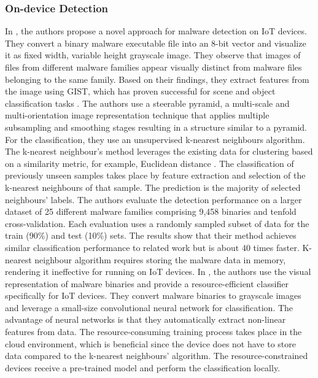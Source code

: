\documentclass[conference, 11pt]{IEEEtran}
\begin{document}
    \subsubsection{On-device Detection}
    In \cite{article:7}, the authors propose a novel approach for malware detection on IoT devices.
    They convert a binary malware executable file into an 8-bit vector and visualize it as fixed width, variable height grayscale image.
    They observe that images of files from different malware families appear visually distinct from malware files belonging to the same family.
    Based on their findings, they extract features from the image using GIST, which has proven successful for scene and object classification tasks \cite{torralba2003context}.
    The authors use a steerable pyramid, a multi-scale and multi-orientation image representation technique that applies multiple subsampling and smoothing stages resulting in a structure similar to a pyramid.
    For the classification, they use an unsupervised k-nearest neighbours algorithm.
    The k-nearest neighbour's method leverages the existing data for clustering based on a similarity metric, for example, Euclidean distance \cite{taunk2019brief}.
    The classification of previously unseen samples takes place by feature extraction and selection of the k-nearest neighbours of that sample.
    The prediction is the majority of selected neighbours' labels.
    The authors evaluate the detection performance on a larger dataset of 25 different malware families comprising 9,458 binaries and tenfold cross-validation.
    Each evaluation uses a randomly sampled subset of data for the train (90\%) and test (10\%) sets.
    The results show that their method achieves similar classification performance to related work but is about 40 times faster.
    K-nearest neighbour algorithm requires storing the malware data in memory, rendering it ineffective for running on IoT devices.
    In \cite{article:3}, the authors use the visual representation of malware binaries and provide a resource-efficient classifier specifically for IoT devices.
    They convert malware binaries to grayscale images and leverage a small-size convolutional neural network for classification.
    The advantage of neural networks is that they automatically extract non-linear features from data.
    The resource-consuming training process takes place in the cloud environment, which is beneficial since the device does not have to store data compared to the k-nearest neighbours' algorithm.
    The resource-constrained devices receive a pre-trained model and perform the classification locally.
\end{document}
